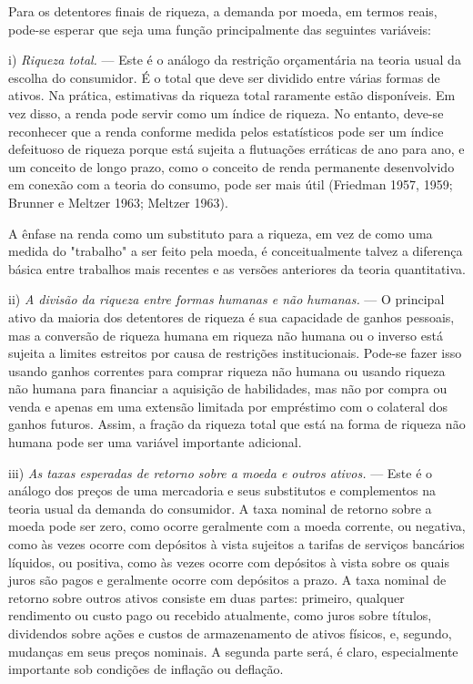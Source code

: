 \documentclass[12pt]{article}
\begin{document}
Para os detentores finais de riqueza, a demanda por moeda, em termos reais, pode-se esperar que seja uma função principalmente das seguintes variáveis:

i) \textit{Riqueza total.} — Este é o análogo da restrição orçamentária na teoria usual da escolha do consumidor. É o total que deve ser dividido entre várias formas de ativos. Na prática, estimativas da riqueza total raramente estão disponíveis. Em vez disso, a renda pode servir como um índice de riqueza. No entanto, deve-se reconhecer que a renda conforme medida pelos estatísticos pode ser um índice defeituoso de riqueza porque está sujeita a flutuações erráticas de ano para ano, e um conceito de longo prazo, como o conceito de renda permanente desenvolvido em conexão com a teoria do consumo, pode ser mais útil (Friedman 1957, 1959; Brunner e Meltzer 1963; Meltzer 1963).

A ênfase na renda como um substituto para a riqueza, em vez de como uma medida do "trabalho" a ser feito pela moeda, é conceitualmente talvez a diferença básica entre trabalhos mais recentes e as versões anteriores da teoria quantitativa.

ii) \textit{A divisão da riqueza entre formas humanas e não humanas.} — O principal ativo da maioria dos detentores de riqueza é sua capacidade de ganhos pessoais, mas a conversão de riqueza humana em riqueza não humana ou o inverso está sujeita a limites estreitos por causa de restrições institucionais. Pode-se fazer isso usando ganhos correntes para comprar riqueza não humana ou usando riqueza não humana para financiar a aquisição de habilidades, mas não por compra ou venda e apenas em uma extensão limitada por empréstimo com o colateral dos ganhos futuros. Assim, a fração da riqueza total que está na forma de riqueza não humana pode ser uma variável importante adicional.

iii) \textit{As taxas esperadas de retorno sobre a moeda e outros ativos.} — Este é o análogo dos preços de uma mercadoria e seus substitutos e complementos na teoria usual da demanda do consumidor. A taxa nominal de retorno sobre a moeda pode ser zero, como ocorre geralmente com a moeda corrente, ou negativa, como às vezes ocorre com depósitos à vista sujeitos a tarifas de serviços bancários líquidos, ou positiva, como às vezes ocorre com depósitos à vista sobre os quais juros são pagos e geralmente ocorre com depósitos a prazo. A taxa nominal de retorno sobre outros ativos consiste em duas partes: primeiro, qualquer rendimento ou custo pago ou recebido atualmente, como juros sobre títulos, dividendos sobre ações e custos de armazenamento de ativos físicos, e, segundo, mudanças em seus preços nominais. A segunda parte será, é claro, especialmente importante sob condições de inflação ou deflação.
\end{document}
